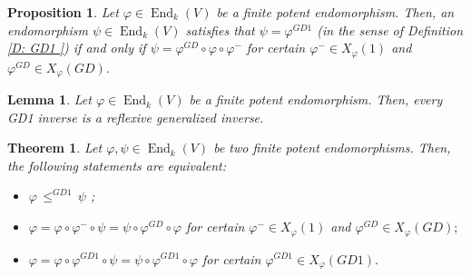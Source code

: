 \documentclass[10pt,a4paper]{amsart}
\newtheorem{prop}{Proposition}
\newtheorem{lem}{Lemma}
\newtheorem{thm}{Theorem}
\newcommand\ed{\operatorname{End}}
\newcommand{\f}{\varphi}
\newcommand{\g}{\psi}
\begin{document}
\begin{prop}\label{T: Charact Algebraica}
Let $\f \in \ed_k(V)$ be a finite potent endomorphism. Then, an endomorphism $\g\in \ed_k(V)$ satisfies that $\g=\f^{GD1}$ (in the sense of Definition \ref{D: GD1 }) if and only if $\g=\f^{GD}\circ \f\circ \f^{-}$ for certain $\f^-\in X_{\f}(1)$ and $\f^{GD}\in X_{\f}(GD).$ 
\end{prop}

\begin{lem}\label{L: GD1 son reflex}
Let $\f \in \ed_k(V)$ be a finite potent endomorphism. Then, every GD1 inverse is a reflexive generalized inverse.
\end{lem}

\begin{thm}\label{T:3 equiv  }
Let $\f,\g \in \ed_k(V)$ be two finite potent endomorphisms. Then, the following statements are equivalent:
\begin{itemize}
\item[I.)] $\f \, \leq^{GD1} \, \g$  ;
\item[II.)] $\f=\f\circ \f^{-}\circ \g=\g \circ \f^{GD}\circ \f$ for certain $\f^{-}\in X_{\f}(1)$ and $\f^{GD}\in X_{\f}(GD);$  
\item[III.)] $\f=\f\circ \f^{GD1}\circ \g=\g\circ \f^{GD1}\circ \f$ for certain $\f^{GD1}\in X_{\f}(GD1).$
\end{itemize}
\end{thm}
\end{document}

